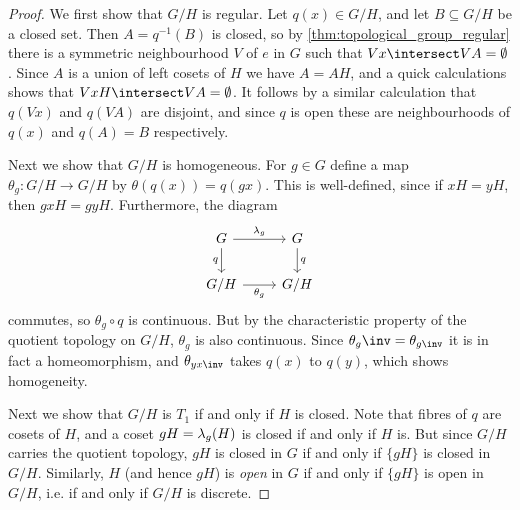 \documentclass[article, a4paper, 11pt, oneside]{memoir}
\numberwithin{equation}{chapter}
\newcommand{\preim}{^{-1}}
\begin{document}
\begin{proof}
    We first show that $G/H$ is regular. Let $q(x) \in G/H$, and let $B \subseteq G/H$ be a closed set. Then $A = q\preim(B)$ is closed, so by \cref{thm:topological_group_regular} there is a symmetric neighbourhood $V$ of $e$ in $G$ such that $Vx \intersect VA = \emptyset$. Since $A$ is a union of left cosets of $H$ we have $A = AH$, and a quick calculations shows that $VxH \intersect VA = \emptyset$. It follows by a similar calculation that $q(Vx)$ and $q(VA)$ are disjoint, and since $q$ is open these are neighbourhoods of $q(x)$ and $q(A) = B$ respectively.

    Next we show that $G/H$ is homogeneous. For $g \in G$ define a map $\theta_g \colon G/H \to G/H$ by $\theta(q(x)) = q(gx)$. This is well-defined, since if $xH = yH$, then $gxH = gyH$. Furthermore, the diagram
    \begin{equation*}
        \begin{tikzcd}
            G
                \ar[r, "\leftmult_g"]
                \ar[d, "q", swap]
            & G
                \ar[d, "q"] \\
            G/H
                \ar[r, "\theta_g", swap]
            & G/H
        \end{tikzcd}
    \end{equation*}
    commutes, so $\theta_g \circ q$ is continuous. But by the characteristic property of the quotient topology on $G/H$, $\theta_g$ is also continuous. Since $\theta_g\inv = \theta_{g\inv}$ it is in fact a homeomorphism, and $\theta_{yx\inv}$ takes $q(x)$ to $q(y)$, which shows homogeneity.

    Next we show that $G/H$ is $T_1$ if and only if $H$ is closed. Note that fibres of $q$ are cosets of $H$, and a coset $gH = \lambda_g(H)$ is closed if and only if $H$ is. But since $G/H$ carries the quotient topology, $gH$ is closed in $G$ if and only if $\{gH\}$ is closed in $G/H$. Similarly, $H$ (and hence $gH$) is \emph{open} in $G$ if and only if $\{gH\}$ is open in $G/H$, i.e. if and only if $G/H$ is discrete.



\end{proof}
\end{document}
